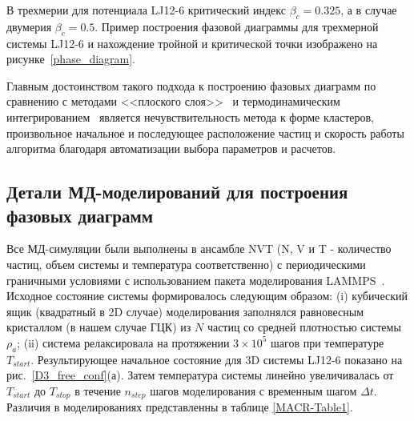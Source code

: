 В трехмерии для потенциала LJ12-6 критический индекс $\beta_c = 0.325$, а в случае двумерия $\beta_c = 0.5$.
Пример построения фазовой диаграммы для трехмерной системы LJ12-6 и нахождение тройной и критической точки изображено на рисунке~\ref{phase_diagram}.

Главным достоинством такого подхода к построению фазовых диаграмм по сравнению с методами <<плоского слоя>>~\cite{10.1021/jp806127j, 10.1021/jp1117213} и термодинамическим интегрированием~\cite{10.1088/0953-8984/21/46/465104} является нечувствительность метода к форме кластеров, произвольное начальное и последующее расположение частиц и скорость работы алгоритма благодаря автоматизации выбора параметров и расчетов.



\subsection{Детали МД-моделирований для построения фазовых диаграмм}
\label{PRIMe-SubSecPhaseDiagramMD}



Все МД-симуляции были выполнены в ансамбле NVT (N, V и T - количество частиц, объем системы и температура соответственно) с периодическими граничными условиями с использованием пакета моделирования LAMMPS~\cite{10.1006/jcph.1995.1039}.
Исходное состояние системы формировалось следующим образом: (i) кубический ящик (квадратный в 2D случае) моделирования заполнялся равновесным кристаллом (в нашем случае ГЦК) из $N$ частиц со средней плотностью системы $\rho_a$; (ii) система релаксировала на протяжении $3 \times 10^5$ шагов при температуре $T_{start}$.
Результирующее начальное состояние для 3D системы LJ12-6 показано на рис.~\ref{D3_free_conf}(а).
Затем температура системы линейно увеличивалась от $T_{start}$ до $T_{stop}$ в течение $n_{step}$ шагов моделирования с временным шагом $\Delta t$. Различия в моделированиях представленны в таблице \ref{MACR-Table1}.

